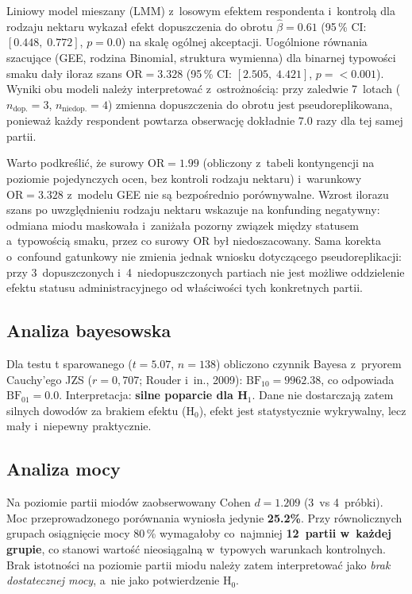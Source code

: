 Liniowy model mieszany (LMM) z~losowym efektem respondenta i~kontrolą dla
rodzaju nektaru wykazał efekt dopuszczenia do obrotu $\hat{\beta} = 0.61$
(95\,\% CI: $[0.448,\;0.772]$, $p = 0.0$)
na skalę ogólnej akceptacji.
Uogólnione równania szacujące (GEE, rodzina Binomial, struktura wymienna)
dla binarnej typowości smaku dały iloraz szans
$\mathrm{OR} = 3.328$
(95\,\% CI: $[2.505,\;4.421]$,
$p = <0.001$).
Wyniki obu modeli należy interpretować z~ostrożnością: przy zaledwie
7~lotach ($n_{\mathrm{dop.}} = 3$,
$n_{\mathrm{niedop.}} = 4$) zmienna dopuszczenia do obrotu
jest pseudoreplikowana, ponieważ każdy respondent powtarza obserwację dokładnie
$7.0$ razy dla tej samej partii.

Warto podkreślić, że surowy $\mathrm{OR} = 1.99$ (obliczony z~tabeli kontyngencji
na poziomie pojedynczych ocen, bez kontroli rodzaju nektaru) i~warunkowy
$\mathrm{OR} = 3.328$ z~modelu GEE nie są bezpośrednio porównywalne.
Wzrost ilorazu szans po uwzględnieniu rodzaju nektaru wskazuje na konfunding
negatywny: odmiana miodu maskowała i~zaniżała pozorny związek między statusem
a~typowością smaku, przez co surowy OR był niedoszacowany. Sama korekta
o~confound gatunkowy nie zmienia jednak wniosku dotyczącego pseudoreplikacji:
przy 3~dopuszczonych i~4~niedopuszczonych partiach
nie jest możliwe oddzielenie efektu statusu administracyjnego od właściwości
tych konkretnych partii.

\subsection{Analiza bayesowska}

Dla testu t sparowanego ($t = 5.07$, $n = 138$) obliczono
czynnik Bayesa z~pryorem Cauchy'ego JZS ($r = 0{,}707$;
Rouder i~in., 2009): $\mathrm{BF}_{10} = 9962.38$, co odpowiada
$\mathrm{BF}_{01} = 0.0$.
Interpretacja: \textbf{silne poparcie dla H$_1$}.
Dane nie dostarczają zatem silnych dowodów za brakiem efektu (H$_0$),
efekt jest statystycznie wykrywalny, lecz mały i~niepewny praktycznie.

\subsection{Analiza mocy}

Na poziomie partii miodów zaobserwowany Cohen $d = 1.209$
(3~vs 4~próbki).
Moc przeprowadzonego porównania wyniosła jedynie
\textbf{25.2\%}.
Przy równolicznych grupach osiągnięcie mocy 80\,\% wymagałoby
co~najmniej \textbf{12~partii w~każdej grupie},
co stanowi wartość nieosiągalną w~typowych warunkach kontrolnych.
Brak istotności na poziomie partii miodu należy zatem interpretować jako
\emph{brak dostatecznej mocy}, a~nie jako potwierdzenie H$_0$.

